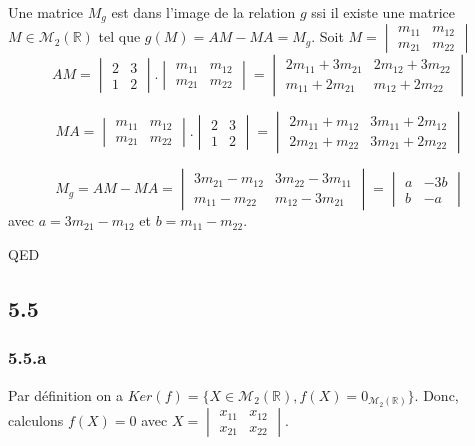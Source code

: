 \documentclass[]{book}
\theoremstyle{definition}
\newcommand{\bb}[1]{\mathbb{#1}}
\newcommand{\R}{\bb{R}}
\begin{document}
Une matrice $M_g$ est dans l'image de la relation $g$ ssi il existe une matrice $M \in \mathcal{M}_2(\R)$ tel que $g(M) = AM - MA = M_g$. Soit $M = \begin{vmatrix} m_{11} & m_{12} \\ m_{21} & m_{22} \end{vmatrix}$\\

$$
AM = \begin{vmatrix} 2 & 3 \\ 1 & 2 \end{vmatrix} . \begin{vmatrix} m_{11} & m_{12} \\ m_{21} & m_{22} \end{vmatrix} =
\begin{vmatrix} 2m_{11} +  3m_{21} & 2m_{12} + 3m_{22} \\ m_{11} + 2 m_{21} & m_{12} + 2m_{22} \end{vmatrix}
$$

$$
MA = \begin{vmatrix} m_{11} & m_{12} \\ m_{21} & m_{22} \end{vmatrix} . \begin{vmatrix} 2 & 3 \\ 1 & 2 \end{vmatrix}  =
\begin{vmatrix} 2m_{11} +  m_{12} & 3m_{11} + 2m_{12} \\ 2m_{21} + m_{22} & 3m_{21} + 2m_{22} \end{vmatrix}
$$

$$
M_g = AM - MA = 
\begin{vmatrix} 3m_{21} -  m_{12} & 3m_{22} - 3m_{11} \\ m_{11} - m_{22} & m_{12} - 3m_{21} \end{vmatrix} =
\begin{vmatrix} a & -3b \\ b & -a \end{vmatrix}
$$
avec $a=3m_{21} -  m_{12}$ et $b = m_{11} - m_{22}$.

QED


\subsection*{5.5}	
\subsubsection*{5.5.a}
Par d\'efinition on a $Ker(f) = \{ X \in \mathcal{M}_2(\R), f(X) = 0_{\mathcal{M}_2(\R)}\}$. Donc, calculons $f(X) = 0$ avec $X=\begin{vmatrix} x_{11} & x_{12} \\ x_{21} & x_{22} \end{vmatrix}$.\\
\end{document}
